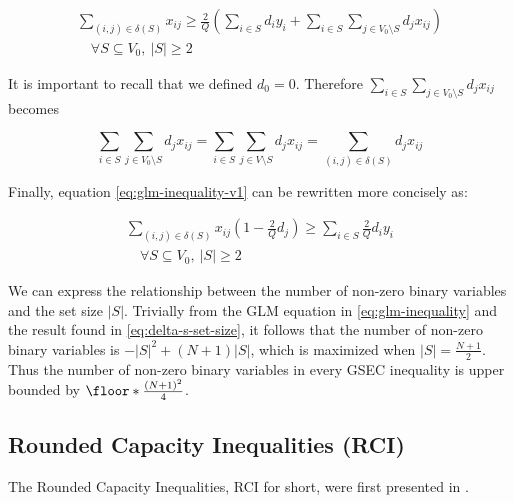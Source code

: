 \begin{equation}\label{eq:glm-inequality-v1}
	\begin{split}
		\sum_{(i, j) \in \delta(S)} x_{ij} \ge \frac{2}{Q} \left(  \sum_{i \in S} d_i y_i + \sum_{i \in S} \sum_{j \in V_0 \setminus S} d_j  x_{ij}\right) \\ \quad \forall S \subseteq V_0,\ |S| \ge 2
	\end{split}
\end{equation}

It is important to recall that we defined $d_0 = 0$.
Therefore $\sum_{i \in S} \sum_{j \in V_0 \setminus S} d_j  x_{ij}$ becomes

\begin{equation}
	\sum_{i \in S} \sum_{j \in V_0 \setminus S} d_j  x_{ij} = \sum_{i \in S} \sum_{j \in V \setminus S} d_j  x_{ij} = \sum_{(i, j) \in \delta(S)} d_j x_{ij}
\end{equation}

Finally, equation \eqref{eq:glm-inequality-v1} can be rewritten more concisely as:

\begin{equation}\label{eq:glm-inequality}
	\begin{split}
		\sum_{(i, j) \in \delta(S)} x_{ij} \left( 1 - \frac{2}{Q} d_j \right)    \ge \sum_{i \in S} \frac{2}{Q} d_i y_i  \\ \quad \forall S \subseteq V_0,\ |S| \ge 2
	\end{split}
\end{equation}


We can express the relationship between the number of non-zero binary variables and the set size $|S|$.
Trivially from the GLM equation in \eqref{eq:glm-inequality} and the result found in \eqref{eq:delta-s-set-size}, it follows that the number of non-zero binary variables is $-|S|^2 + (N + 1)|S|$, which is maximized when $|S| = \frac{N+1}{2}$.
Thus the number of non-zero binary variables in every GSEC inequality is upper bounded by $\floor*{ \frac{\left( N + 1 \right)^2}{4}}$.


\subsection{Rounded Capacity Inequalities (RCI)}
The Rounded Capacity Inequalities, RCI for short, were first presented in \cite{achuthan_capacitated_1998}.
